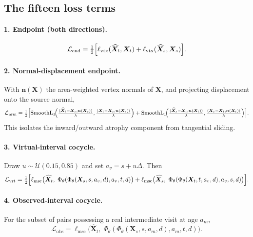 \documentclass[11pt]{article}
\newcommand{\X}{\bm{X}}
\newcommand{\nrm}{\bm{n}}
\newcommand{\Loss}{\mathcal{L}}
\newcommand{\SL}{\operatorname{SmoothL}_1}
\begin{document}
\subsection{The fifteen loss terms}

\paragraph{1. Endpoint (both directions).}
\begin{equation}
  \Loss_{\mathrm{end}} = \tfrac{1}{2}\Bigl[
    \ell_{\mathrm{vtx}}(\widehat{\X}_t, \X_t) +
    \ell_{\mathrm{vtx}}(\widehat{\X}_s, \X_s) \Bigr].
\end{equation}

\paragraph{2. Normal-displacement endpoint.} With $\nrm(\X)$ the area-weighted vertex
normals of $\X$, and projecting displacement onto the source normal,
\begin{equation}
  \Loss_{\mathrm{nrm}} = \tfrac{1}{2}\Bigl[
    \SL\!\Bigl(\tfrac{\langle \widehat{\X}_t - \X_s, \nrm(\X_s)\rangle}{\lambda},
               \tfrac{\langle \X_t - \X_s, \nrm(\X_s)\rangle}{\lambda}\Bigr)
  + \SL\!\Bigl(\tfrac{\langle \widehat{\X}_s - \X_t, \nrm(\X_t)\rangle}{\lambda},
               \tfrac{\langle \X_s - \X_t, \nrm(\X_t)\rangle}{\lambda}\Bigr) \Bigr].
\end{equation}
This isolates the inward/outward atrophy component from tangential sliding.

\paragraph{3. Virtual-interval cocycle.} Draw $u \sim \mathcal{U}(0.15, 0.85)$ and set
$a_v = s + u\Delta$. Then
\begin{equation}
  \Loss_{\mathrm{vrt}} = \tfrac{1}{2}\Bigl[
    \ell_{\mathrm{mse}}\bigl(\widehat{\X}_t,\; \Phi_\theta(\Phi_\theta(\X_s,s,a_v,d),a_v,t,d)\bigr)
  + \ell_{\mathrm{mse}}\bigl(\widehat{\X}_s,\; \Phi_\theta(\Phi_\theta(\X_t,t,a_v,d),a_v,s,d)\bigr)
  \Bigr].
\end{equation}

\paragraph{4. Observed-interval cocycle.} For the subset of pairs possessing a real
intermediate visit at age $a_m$,
\begin{equation}
  \Loss_{\mathrm{obs}} = \ell_{\mathrm{mse}}\bigl(\widehat{\X}_t,\;
    \Phi_\theta(\Phi_\theta(\X_s,s,a_m,d), a_m, t, d)\bigr).
\end{equation}
\end{document}
